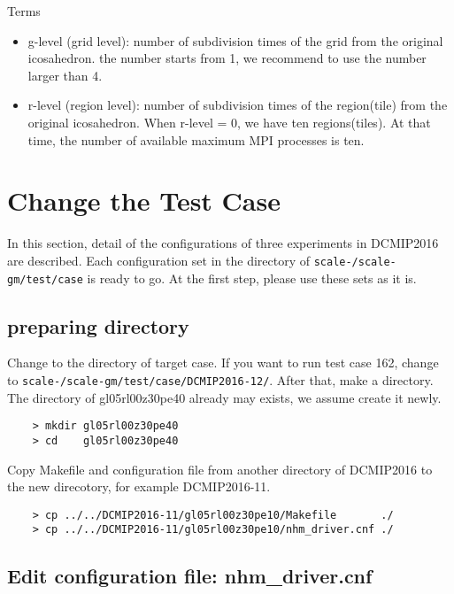 
 {\sf Terms}
 \begin{itemize}
   \item g-level (grid level): number of subdivision times of the grid from the original icosahedron.
         the number starts from 1, we recommend to use the number larger than 4.
   \item r-level (region level): number of subdivision times of the region(tile)
         from the original icosahedron. When r-level = 0, we have ten regions(tiles).
         At that time, the number of available maximum MPI processes is ten.
 \end{itemize}

\section{Change the Test Case}

 \noindent In this section, detail of the configurations of three experiments
 in DCMIP2016 are described. Each configuration set in the directory of \texttt{scale-{\version}/scale-gm/test/case}
 is ready to go. At the first step, please use these sets as it is.

\subsection{preparing directory}
 Change to the directory of target case. If you want to run test case 162,
 change to \texttt{scale-{\version}/scale-gm/test/case/DCMIP2016-12/}. After that, make a directory.
 The directory of gl05rl00z30pe40 already may exists, we assume create it newly.
 \begin{verbatim}
    > mkdir gl05rl00z30pe40
    > cd    gl05rl00z30pe40
 \end{verbatim}

 \noindent Copy Makefile and configuration file from another directory
 of DCMIP2016 to the new direcotory, for example DCMIP2016-11.
 \begin{verbatim}
    > cp ../../DCMIP2016-11/gl05rl00z30pe10/Makefile       ./
    > cp ../../DCMIP2016-11/gl05rl00z30pe10/nhm_driver.cnf ./
 \end{verbatim}

\subsection{Edit configuration file: nhm\_driver.cnf}

